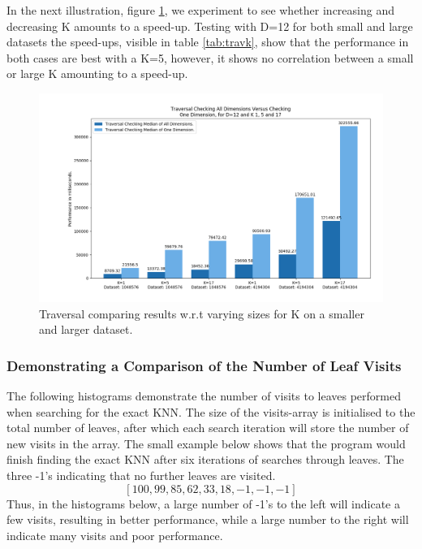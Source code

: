 \noindent In the next illustration, figure \ref{fig:trav2}, we experiment to see whether increasing and decreasing K amounts to a speed-up. Testing with D=12 for both small and large datasets the speed-ups, visible in table \ref{tab:travk}, show that the performance in both cases are best with a K=5, however, it shows no correlation between a small or large K amounting to a speed-up. 





\begin{figure}[H]
\centering
\includegraphics[width=1\textwidth]{pics/plot-figs/new-trav-d12-k1k5k17.png}
\caption{Traversal comparing results w.r.t varying sizes for K on a smaller and larger dataset.}
\label{fig:trav2}
\end{figure}


\subsubsection{Demonstrating a Comparison of the Number of Leaf Visits}
\label{sec:evaltravhist}

The following histograms demonstrate the number of visits to leaves performed when searching for the exact KNN. The size of the visits-array is initialised to the total number of leaves,  after which each search iteration will store the number of new visits in the array. The small example below shows that the program would finish finding the exact KNN after six iterations of searches through leaves. The three -1’s indicating that no further leaves are visited. 
$$[100, 99, 85, 62, 33, 18, -1, -1, -1]$$
Thus, in the histograms below, a large number of -1's to the left will indicate a few visits, resulting in better performance, while a large number to the right will indicate many visits and poor performance.  

